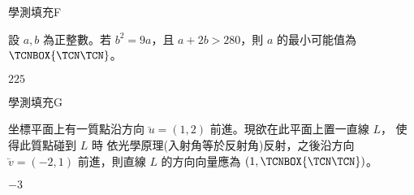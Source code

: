     \begin{QUESTION}
        \begin{ExamInfo}{97}{學測}{填充}{F}
        \end{ExamInfo}
        \begin{ExamAnsRateInfo}{20}{34}{19}{7}
        \end{ExamAnsRateInfo}
        \begin{QBODY}
            設 $a ,b$ 為正整數。若 $b^2 =9a$，且 $a+2b>280$，則 $a$ 的最小可能值為 
$\TCNBOX{\TCN\TCN}$。
        \end{QBODY}
        \begin{QFROMS}
        \end{QFROMS}
        \begin{QTAGS}\end{QTAGS}
        \begin{QANS}
            $225$
        \end{QANS}
        \begin{QSOLLIST}
        \end{QSOLLIST}
        \begin{QEMPTYSPACE}
        \end{QEMPTYSPACE}
    \end{QUESTION}
    \begin{QUESTION}
        \begin{ExamInfo}{97}{學測}{填充}{G}
        \end{ExamInfo}
        \begin{ExamAnsRateInfo}{30}{65}{19}{6}
        \end{ExamAnsRateInfo}
        \begin{QBODY}
            坐標平面上有一質點沿方向 $\lvec{u} = (1, 2)$ 前進。現欲在此平面上置一直線 $L$，
			使得此質點碰到 $L$ 時 依光學原理(入射角等於反射角)反射，之後沿方向 $\lvec{v} = (-2, 1)$ 前進，則直線 $L$ 的方向向量應為 $(1, 
			\TCNBOX{\TCN\TCN})$。
        \end{QBODY}
        \begin{QFROMS}
        \end{QFROMS}
        \begin{QTAGS}\end{QTAGS}
        \begin{QANS}
            $-3$
        \end{QANS}
        \begin{QSOLLIST}
        \end{QSOLLIST}
        \begin{QEMPTYSPACE}
        \end{QEMPTYSPACE}
    \end{QUESTION}
